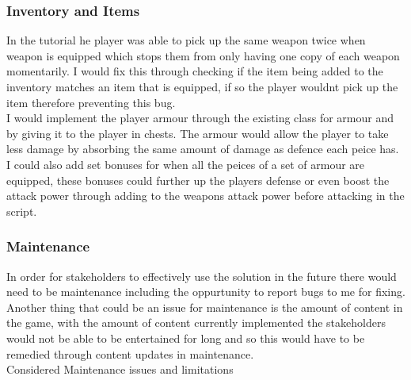 \documentclass{article}
\begin{document}
        \subsubsection{Inventory and Items}
        In the tutorial he player was able to pick up the same weapon twice when weapon is equipped which stops them from only having one copy of each weapon momentarily. I would fix this through checking if the item being added to the inventory matches an item that is equipped, if so the player wouldnt pick up the item therefore preventing this bug.\\
        I would implement the player armour through the existing class for armour and by giving it to the player in chests. The armour would allow the player to take less damage by absorbing the same amount of damage as defence each peice has. I could also add set bonuses for when all the peices of a set of armour are equipped, these bonuses could further up the players defense or even boost the attack power through adding to the weapons attack power before attacking in the script.\\
        \subsubsection{Maintenance}
        In order for stakeholders to effectively use the solution in the future there would need to be maintenance including the oppurtunity to report bugs to me for fixing. Another thing that could be an issue for maintenance is the amount of content in the game, with the amount of content currently implemented the stakeholders would not be able to be entertained for long and so this would have to be remedied through content updates in maintenance.\\
        Considered Maintenance issues and limitations\\
\end{document}
